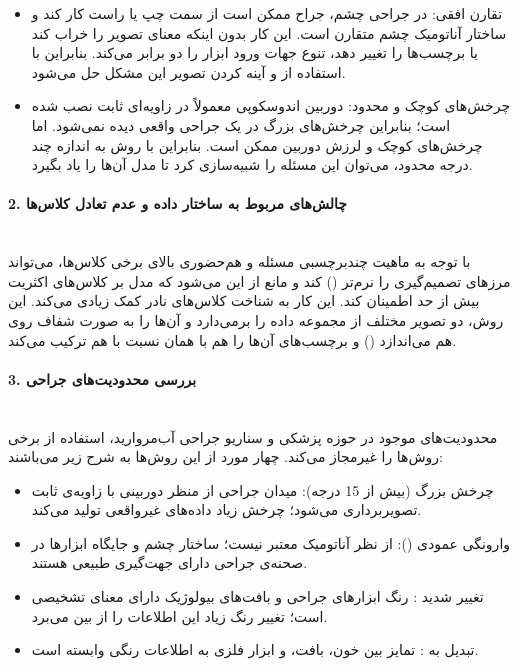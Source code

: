 \documentclass{article}
\begin{document}
\begin{itemize}
\item تقارن افقی:
در جراحی چشم، جراح ممکن است از سمت چپ یا راست کار کند و ساختار آناتومیک چشم متقارن است. این کار بدون اینکه معنای تصویر را خراب کند یا برچسب‌ها را تغییر دهد، تنوع جهات ورود ابزار را دو برابر می‌کند. بنابراین با استفاده از  و آینه کردن تصویر این مشکل حل می‌شود.

\item چرخش‌های کوچک و محدود:
دوربین اندوسکوپی معمولاً در زاویه‌ای ثابت نصب شده است؛ بنابراین چرخش‌های بزرگ در یک جراحی واقعی دیده نمی‌شود. اما چرخش‌های کوچک و لرزش دوربین ممکن است. بنابراین با روش  به اندازه چند درجه محدود، می‌توان این مسئله را شبیه‌سازی کرد تا مدل آن‌ها را یاد بگیرد.
\end{itemize}

\paragraph{2. چالش‌های مربوط به ساختار داده و عدم تعادل کلاس‌ها}\mbox{}\\

با توجه به ماهیت چندبرچسبی مسئله و هم‌حضوری بالای برخی کلاس‌ها،  می‌تواند مرزهای تصمیم‌گیری را نرم‌تر () کند و مانع از این می‌شود که مدل بر کلاس‌های اکثریت بیش از حد اطمینان کند. این کار به شناخت کلاس‌های نادر کمک زیادی می‌کند.
این روش، دو تصویر مختلف از مجموعه ‌داده را برمی‌دارد و آن‌ها را به صورت شفاف روی هم می‌اندازد () و برچسب‌های آن‌ها را هم با همان نسبت با هم ترکیب می‌کند. 

\paragraph{3. بررسی محدودیت‌های جراحی}\mbox{}\\
محدودیت‌های موجود در حوزه پزشکی و سناریو جراحی آب‌مروارید، استفاده از برخی روش‌ها را غیرمجاز می‌کند. چهار مورد از این روش‌ها به شرح زیر می‌باشند:
\begin{itemize}
    \item چرخش بزرگ (بیش از 15 درجه): میدان جراحی از منظر دوربینی با زاویه‌ی ثابت تصویربرداری می‌شود؛ چرخش زیاد داده‌های غیرواقعی تولید می‌کند.
    \item وارونگی عمودی (): از نظر آناتومیک معتبر نیست؛ ساختار چشم و جایگاه ابزارها در صحنه‌ی جراحی دارای جهت‌گیری طبیعی هستند.
    \item تغییر شدید : رنگ ابزارهای جراحی و بافت‌های بیولوژیک دارای معنای تشخیصی است؛ تغییر رنگ زیاد این اطلاعات را از بین می‌برد.
    \item تبدیل به : تمایز بین خون، بافت، و ابزار فلزی به اطلاعات رنگی وابسته است.
\end{itemize}
\end{document}
